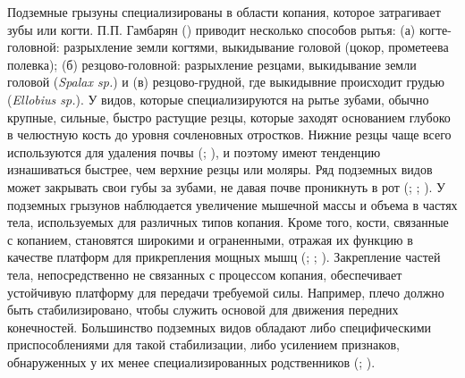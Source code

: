Подземные грызуны специализированы в области копания, которое затрагивает зубы или когти. П.П. Гамбарян (\cite{Gambaryan1960}) приводит несколько способов рытья: (а) когте-головной: разрыхление земли когтями, выкидывание головой (цокор, прометеева полевка); (б) резцово-головной: разрыхление резцами, выкидывание земли головой (\textit{Spalax sp.}) и (в) резцово-грудной, где выкидывние происходит грудью (\textit{Ellobius sp.}). У видов, которые специализируются на рытье зубами, обычно крупные, сильные, быстро растущие резцы, которые заходят основанием глубоко в челюстную кость до уровня сочленовных отростков. Нижние резцы чаще всего используются для удаления почвы (\cite{Gambaryan1960}; \cite{Hildebrand1985}), и поэтому имеют тенденцию изнашиваться быстрее, чем верхние резцы или моляры. Ряд подземных видов может закрывать свои губы за зубами, не давая почве проникнуть в рот (\cite{Gambaryan1960}; \cite{Nevo1979}; \cite{Hildebrand1985}). У подземных грызунов наблюдается увеличение мышечной массы и объема в частях тела, используемых для различных типов копания. Кроме того, кости, связанные с копанием, становятся широкими и ограненными, отражая их функцию в качестве платформ для прикрепления мощных мышц (\cite{Gambaryan1960}; \cite{Lehmann1963}; \cite{Yalden2009}). Закрепление частей тела, непосредственно не связанных с процессом копания, обеспечивает устойчивую платформу для передачи требуемой силы. Например, плечо должно быть стабилизировано, чтобы служить основой для движения передних конечностей. Большинство подземных видов обладают либо специфическими приспособлениями для такой стабилизации, либо усилением признаков, обнаруженных у их менее специализированных родственников (\cite{Gambaryan1960}; \cite{Puttick1977}).



